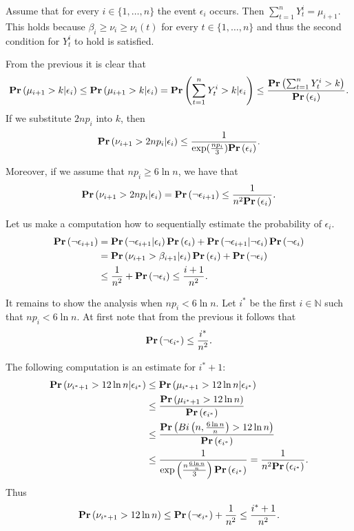 Assume that for every $i \in \{1, \dots, n\}$ the event $\epsilon_i$ occurs. Then $\displaystyle\sum_{t = 1}^{n} Y_t^i = \mu_{i + 1}$. This holds because $\beta_i \geq \nu_i \geq \nu_i(t)$ for every $t \in \{1, \dots, n\}$ and thus the second condition for $Y_t^i$ to hold is satisfied. 

From the previous it is clear that 
\[
\mathbf{Pr}\left(\mu_{i + 1} > k | \epsilon_i\right) \leq \mathbf{Pr}\left(\mu_{i + 1} > k | \epsilon_i\right) = \mathbf{Pr}\left(\displaystyle\sum_{t = 1}^{n} Y_t^{i} > k | \epsilon_i\right) \leq \frac{\mathbf{Pr}\left(\sum_{t = 1}^{n} Y_t^{i} > k\right)}{\mathbf{Pr}\left(\epsilon_i\right)}\textit{.}
\]
If we substitute $2np_i$ into $k$, then
\[
\mathbf{Pr}\left(\nu_{i + 1} > 2np_i | \epsilon_i\right) \leq \frac{1}{\exp(\frac{np_i}{3})\mathbf{Pr}\left(\epsilon_i\right)} \text{.}
\]

Moreover, if we assume that $np_i \geq 6 \ln n$, we have that 
\[
\mathbf{Pr}\left(\nu_{i + 1} > 2np_i | \epsilon_i\right) = \mathbf{Pr}\left(\neg \epsilon_{i + 1}\right) \leq \frac{1}{n ^ 2\mathbf{Pr}\left(\epsilon_i\right)} \textit{.}
\]

Let us make a computation how to sequentially estimate the probability of $\epsilon_i$.
\[
\begin{split}
\mathbf{Pr}\left(\neg \epsilon_{i + 1}\right) 
	& = \mathbf{Pr}\left(\neg \epsilon_{i + 1} | \epsilon_i\right)\mathbf{Pr}\left(\epsilon_i\right) + \mathbf{Pr}\left(\neg \epsilon_{i + 1} | \neg \epsilon_i\right)\mathbf{Pr}\left(\neg \epsilon_i\right) \\
	& = \mathbf{Pr}\left(\nu_{i + 1} > \beta_{i + 1} | \epsilon_i\right)\mathbf{Pr}\left(\epsilon_i\right) + \mathbf{Pr}\left(\neg \epsilon_i\right) \\
	& \leq \frac{1}{n ^ 2} + \mathbf{Pr}\left(\neg \epsilon_i\right) \leq \frac{i + 1}{n ^ 2} \textit{.}
\end{split} 
\]

It remains to show the analysis when $np_i < 6 \ln n$. Let $i^*$ be the first $i \in \mathbb{N}$ such that $np_i < 6\ln n$. 
At first note that from the previous it follows that 
\[
\mathbf{Pr}\left(\neg \epsilon_{i^*}\right) \leq \frac{i^*}{n ^ 2} \textit{.}
\]

The following computation is an estimate for $i^* + 1$:
\[
\begin{split}
\mathbf{Pr}\left(\nu_{i^* + 1} > 12 \ln n | \epsilon_{i^*}\right) 
	& \leq \mathbf{Pr}\left(\mu_{i^* + 1} > 12 \ln n | \epsilon_{i^*}\right) \\
	& \leq \frac{\mathbf{Pr}\left(\mu_{i^* + 1} > 12 \ln n\right)}{\mathbf{Pr}\left(\epsilon_{i^*}\right)} \\
	& \leq \frac{\mathbf{Pr}\left(Bi\left(n, \frac{6 \ln n}{n}\right) > 12 \ln n\right)}{\mathbf{Pr}\left(\epsilon_{i^*}\right)} \\
	& \leq \frac{1}{\exp\left(\frac{n\frac{6 \ln n}{n}}{3}\right)\mathbf{Pr}\left(\epsilon_{i^*}\right)} = \frac{1}{n ^ 2 \mathbf{Pr}\left(\epsilon_{i^*}\right)} \textit{.}
\end{split}
\]
Thus
\[
\mathbf{Pr}\left(\nu_{i^* + 1} > 12 \ln n\right) \leq \mathbf{Pr}\left(\neg \epsilon_{i^*}\right) + \frac{1}{n ^ 2} \leq \frac{i^* + 1}{n ^ 2} \textit{.}
\]

